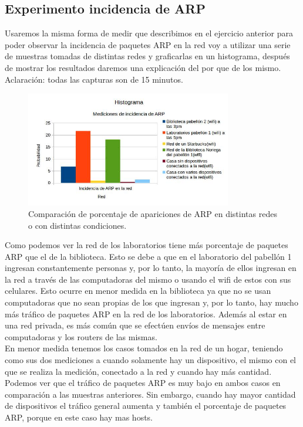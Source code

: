 \subsection{Experimento incidencia de ARP}

Usaremos la misma forma de medir que describimos en el ejercicio anterior para poder observar la incidencia de paquetes ARP en la red voy a utilizar una serie de muestras
tomadas de distintas redes y graficarlas en un histograma, después de mostrar los resultados daremos una explicación del por que de los mismo. Aclaración: todas las capturas
son de 15 minutos.

\begin{figure}[H]
\centering
\includegraphics[width=90mm]{imagenes/IncidenciaARP.jpg}
\caption{Comparación de porcentaje de apariciones de ARP en distintas redes o con distintas condiciones.\label{overflow}}
\end{figure}

Como podemos ver la red de los laboratorios tiene más porcentaje de paquetes ARP que el de la biblioteca. Esto se debe a que en el laboratorio del pabellón 1 ingresan
constantemente personas y, por lo tanto, la mayoría de ellos ingresan en la red a través de las computadoras del mismo o usando el wifi de estos con sus celulares. Esto
ocurre en menor medida en la biblioteca ya que no se usan computadoras que no sean propias de los que ingresan y, por lo tanto, hay mucho más tráfico de paquetes ARP en la red
de los laboratorios. Además al estar en una red privada, es más común que se efectúen envíos de mensajes entre computadoras y los routers de las mismas.\\

En menor medida tenemos los casos tomados en la red de un hogar, teniendo como sus dos mediciones a cuando solamente hay un dispositivo, el mismo con el que se realiza la medición,
conectado a la red y cuando hay más cantidad. Podemos ver que el tráfico de paquetes ARP es muy bajo en ambos casos en comparación a las muestras anteriores. Sin embargo,
cuando hay mayor cantidad de dispositivos el tráfico general aumenta y también el porcentaje de paquetes ARP, porque en este caso hay mas hosts.\\

